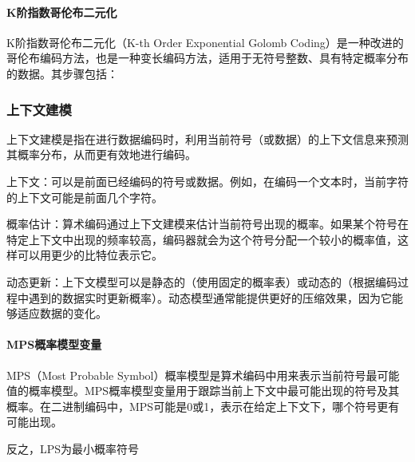 \documentclass{/home/hi/Study/template/code}
\begin{document}
\paragraph{K阶指数哥伦布二元化}
K阶指数哥伦布二元化（K-th Order Exponential Golomb Coding）是一种改进的哥伦布编码方法，也是一种变长编码方法，适用于无符号整数、具有特定概率分布的数据。其步骤包括：

\subsubsection{上下文建模}
\begin{definition}
	上下文建模是指在进行数据编码时，利用当前符号（或数据）的上下文信息来预测其概率分布，从而更有效地进行编码。
\end{definition}

上下文：可以是前面已经编码的符号或数据。例如，在编码一个文本时，当前字符的上下文可能是前面几个字符。

概率估计：算术编码通过上下文建模来估计当前符号出现的概率。如果某个符号在特定上下文中出现的频率较高，编码器就会为这个符号分配一个较小的概率值，这样可以用更少的比特位表示它。

动态更新：上下文模型可以是静态的（使用固定的概率表）或动态的（根据编码过程中遇到的数据实时更新概率）。动态模型通常能提供更好的压缩效果，因为它能够适应数据的变化。


\paragraph{MPS概率模型变量}
\begin{definition}
	MPS（Most Probable Symbol）概率模型是算术编码中用来表示当前符号最可能值的概率模型。MPS概率模型变量用于跟踪当前上下文中最可能出现的符号及其概率。在二进制编码中，MPS可能是0或1，表示在给定上下文下，哪个符号更有可能出现。
\end{definition}
\begin{remark}
	反之，LPS为最小概率符号
\end{remark}
\end{document}
